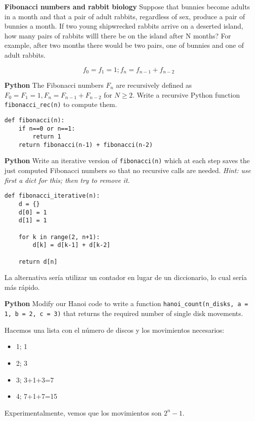 \documentclass[nochap]{config/ejercicios}
\begin{document}
\begin{problemS} \textbf{Fibonacci numbers and rabbit biology}
Suppose that bunnies become adults in a month and that a pair of adult rabbits, regardless of sex, produce a pair of bunnies a month. If two young shipwrecked rabbits arrive on a deserted island, how many pairs of rabbits willl there be on the island after N months? For example, after two months there would be two pairs, one of bunnies and one of adult rabbits. 

$$f_0 = f_1 = 1; f_n = f_{n-1} + f_{n-2}$$
\end{problemS}

\begin{problemS} \textbf{Python}
The Fibonacci numbers $F_n$ are recursively defined as $F_0 = F_1 = 1, F_n = F_{n-1} + F_{n-2}$ for $N \geq 2$. Write a recursive Python function \texttt{fibonacci\_rec(n)} to compute them.

\begin{lstlisting}
def fibonacci(n):
	if n==0 or n==1:
		return 1
	return fibonacci(n-1) + fibonacci(n-2)
\end{lstlisting}
\end{problemS}

\begin{problemS} \textbf{Python}
Write an iterative version of \texttt{fibonacci(n)} which at each step saves the just computed Fibonacci numbers so that no recursive calls are needed. \textit{Hint: use first a dict for this; then try to remove it.}

\begin{lstlisting}
def fibonacci_iterative(n):
	d = {}
	d[0] = 1
	d[1] = 1
	
	for k in range(2, n+1):
		d[k] = d[k-1] + d[k-2]
		
	return d[n]
\end{lstlisting}

La alternativa sería utilizar un contador en lugar de un diccionario, lo cual sería más rápido.
\end{problemS}

\begin{problemS} \textbf{Python}
Modify our Hanoi code to write a function \texttt{hanoi\_count(n\_disks, a = 1, b = 2, c = 3)} that returns the required number of single disk movements.

Hacemos una lista con el número de discos y los movimientos necesarios:
\begin{itemize}
\item 1; 1
\item 2; 3
\item 3; 3+1+3=7
\item 4; 7+1+7=15
\end{itemize}
Experimentalmente, vemos que los movimientos son $2^n-1$.
\end{problemS}
\end{document}

